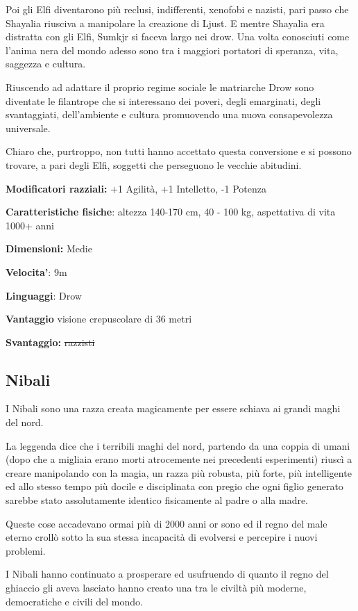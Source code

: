 \documentclass[a4paper,11pt,twoside,openany]{book}
\begin{document}
Poi gli Elfi diventarono più reclusi, indifferenti, xenofobi e nazisti, pari passo che Shayalia riusciva a manipolare la creazione di Ljust. E mentre Shayalia era distratta con gli Elfi, Sumkjr si faceva largo nei drow. Una volta conosciuti come l'anima nera del mondo adesso sono tra i maggiori portatori di speranza, vita, saggezza e cultura.

Riuscendo ad adattare il proprio regime sociale le matriarche Drow sono diventate le filantrope che si interessano dei poveri, degli emarginati, degli svantaggiati, dell'ambiente e cultura promuovendo una nuova consapevolezza universale.

Chiaro che, purtroppo, non tutti hanno accettato questa conversione e si possono trovare, a pari degli Elfi, soggetti che perseguono le vecchie abitudini.

\textbf{Modificatori razziali:} +1 Agilità, +1 Intelletto, -1 Potenza

\textbf{Caratteristiche fisiche}: altezza 140-170 cm, 40 - 100 kg,
aspettativa di vita 1000+ anni

\textbf{Dimensioni:} Medie

\textbf{Velocita'}: 9m

\textbf{Linguaggi}: Drow

\textbf{Vantaggio} visione crepuscolare di 36 metri

\textbf{Svantaggio:} \sout{razzisti}

\subsection{Nibali}

\label{nibali}

I Nibali sono una razza creata magicamente per essere schiava ai grandi maghi del nord.

La leggenda dice che i terribili maghi del nord, partendo da una coppia di umani (dopo che a migliaia erano morti atrocemente nei precedenti esperimenti) riuscì a creare manipolando con la magia, un razza più robusta, più forte, più intelligente ed allo stesso tempo più docile e disciplinata con pregio che ogni figlio generato sarebbe stato assolutamente identico fisicamente al padre o alla madre.

Queste cose accadevano ormai più di 2000 anni or sono ed il regno del male eterno crollò sotto la sua stessa incapacità di evolversi e percepire i nuovi problemi.

I Nibali hanno continuato a prosperare ed usufruendo di quanto il regno del ghiaccio gli aveva lasciato hanno creato una tra le civiltà più moderne, democratiche e civili del mondo.
\end{document}
